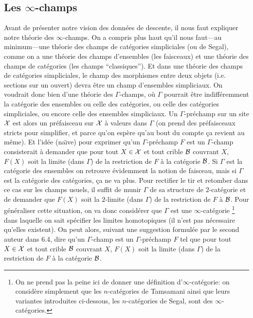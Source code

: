 \documentclass[12pt]{article}
\newcommand{\subnumero}[1]{\subsection*{#1}\phantomsection\addcontentsline{toc}{subsection}{#1}}
\newcommand{\Bb}{{\cal B}}
\newcommand{\Xx}{{\cal X}}
\begin{document}
\subnumero {Les \texorpdfstring{$\infty$}{infini}-champs}

Avant de pr\'esenter notre vision des donn\'ees de descente, il nous faut
expliquer notre th\'eorie des $\infty$-champs.
On a compris plus haut qu'il nous faut---au minimum---une
th\'eorie des champs de cat\'egories simpliciales (ou de Segal), comme on a
une th\'eorie des champs d'ensembles (les faisceaux) et une th\'eorie des
champs de cat\'egories (les champs ``classiques''). Et dans une th\'eorie des
champs de cat\'egories simpliciales, le champ des morphismes entre
deux objets (i.e. sections sur un ouvert) devra \^etre un champ d'ensembles
simpliciaux. On voudrait donc bien d'une th\'eorie des $\Gamma$-champs,
o\`u $\Gamma$ pourrait \^etre
indiff\'eremment
la cat\'egorie des ensembles ou celle des
cat\'egories, ou celle des cat\'egories simpliciales, ou encore celle des
ensembles simpliciaux. Un $\Gamma$-pr\'echamp sur un site $\Xx$ est alors
un pr\'efaisceau sur $\Xx$ \`a valeurs dans $\Gamma$ (on prend des
pr\'efaisceaux stricts pour simplifier, et parce qu'on esp\`ere qu'au bout
du compte
\c{c}a revient au m\^eme). Et l'id\'ee (na\"{\i}ve) pour
exprimer qu'un $\Gamma$-pr\'echamp $F$ est un $\Gamma$-champ consisterait
\`a demander que pour tout $X \in \Xx$ et tout crible $\Bb$ couvrant $X$,
$F(X)$ soit la limite (dans $\Gamma$) de la restriction de $F$ \`a la
cat\'egorie
$\Bb$. Si $\Gamma$ est la cat\'egorie des ensembles on retrouve
\'evidemment la notion de faisceau, mais si $\Gamma$ est la cat\'egorie des
cat\'egories, \c{c}a ne va plus. Pour rectifier le tir et
retomber dans ce cas sur les champs usuels, il suffit
de  munir $\Gamma$ de sa structure de $2$-cat\'egorie et de demander
que $F(X)$ soit la $2$-limite (dans $\Gamma$) de la
restriction de $F$ \`a $\Bb$. Pour g\'en\'eraliser cette situation, on va donc
consid\'erer que $\Gamma$ est une $\infty$-cat\'egorie
\footnote{On ne prend pas la peine ici de donner une d\'efinition
d'$\infty$-cat\'egorie: on consid\`ere simplement que les $n$-cat\'egories
de Tamsamani \cite {Tamsamani} ainsi que leurs variantes introduites ci-dessous,
les $n$-cat\'egories de Segal, sont des $\infty$-cat\'egories.}
dans laquelle on sait sp\'ecifier les limites homotopiques
(il n'est pas n\'ecessaire qu'elles existent). On peut alors, suivant une
suggestion
formul\'ee par le second auteur dans \cite {limits} 6.4, dire
qu'un $\Gamma$-champ est un $\Gamma$-pr\'echamp $F$ tel
que pour tout $X \in \Xx$ et tout crible $\Bb$ couvrant $X$,
$F(X)$ soit la limite (dans $\Gamma$) de la restriction de $F$ \`a la
cat\'egorie
$\Bb$.
\end{document}
